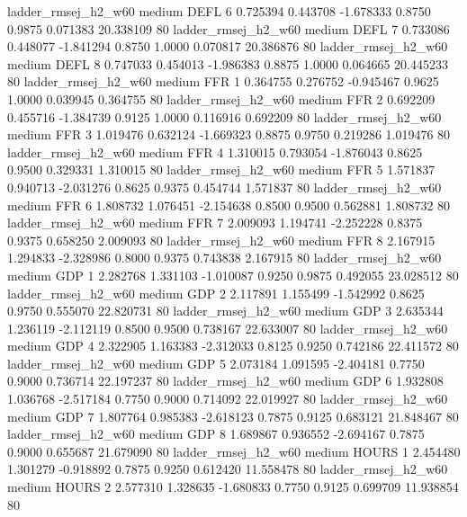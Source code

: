   ladder_rmsej_h2_w60     medium     DEFL                 6  0.725394 0.443708 -1.678333 0.8750 0.9875  0.071383   20.338109 80
   ladder_rmsej_h2_w60     medium     DEFL                 7  0.733086 0.448077 -1.841294 0.8750 1.0000  0.070817   20.386876 80
   ladder_rmsej_h2_w60     medium     DEFL                 8  0.747033 0.454013 -1.986383 0.8875 1.0000  0.064665   20.445233 80
   ladder_rmsej_h2_w60     medium      FFR                 1  0.364755 0.276752 -0.945467 0.9625 1.0000  0.039945    0.364755 80
   ladder_rmsej_h2_w60     medium      FFR                 2  0.692209 0.455716 -1.384739 0.9125 1.0000  0.116916    0.692209 80
   ladder_rmsej_h2_w60     medium      FFR                 3  1.019476 0.632124 -1.669323 0.8875 0.9750  0.219286    1.019476 80
   ladder_rmsej_h2_w60     medium      FFR                 4  1.310015 0.793054 -1.876043 0.8625 0.9500  0.329331    1.310015 80
   ladder_rmsej_h2_w60     medium      FFR                 5  1.571837 0.940713 -2.031276 0.8625 0.9375  0.454744    1.571837 80
   ladder_rmsej_h2_w60     medium      FFR                 6  1.808732 1.076451 -2.154638 0.8500 0.9500  0.562881    1.808732 80
   ladder_rmsej_h2_w60     medium      FFR                 7  2.009093 1.194741 -2.252228 0.8375 0.9375  0.658250    2.009093 80
   ladder_rmsej_h2_w60     medium      FFR                 8  2.167915 1.294833 -2.328986 0.8000 0.9375  0.743838    2.167915 80
   ladder_rmsej_h2_w60     medium      GDP                 1  2.282768 1.331103 -1.010087 0.9250 0.9875  0.492055   23.028512 80
   ladder_rmsej_h2_w60     medium      GDP                 2  2.117891 1.155499 -1.542992 0.8625 0.9750  0.555070   22.820731 80
   ladder_rmsej_h2_w60     medium      GDP                 3  2.635344 1.236119 -2.112119 0.8500 0.9500  0.738167   22.633007 80
   ladder_rmsej_h2_w60     medium      GDP                 4  2.322905 1.163383 -2.312033 0.8125 0.9250  0.742186   22.411572 80
   ladder_rmsej_h2_w60     medium      GDP                 5  2.073184 1.091595 -2.404181 0.7750 0.9000  0.736714   22.197237 80
   ladder_rmsej_h2_w60     medium      GDP                 6  1.932808 1.036768 -2.517184 0.7750 0.9000  0.714092   22.019927 80
   ladder_rmsej_h2_w60     medium      GDP                 7  1.807764 0.985383 -2.618123 0.7875 0.9125  0.683121   21.848467 80
   ladder_rmsej_h2_w60     medium      GDP                 8  1.689867 0.936552 -2.694167 0.7875 0.9000  0.655687   21.679090 80
   ladder_rmsej_h2_w60     medium    HOURS                 1  2.454480 1.301279 -0.918892 0.7875 0.9250  0.612420   11.558478 80
   ladder_rmsej_h2_w60     medium    HOURS                 2  2.577310 1.328635 -1.680833 0.7750 0.9125  0.699709   11.938854 80
